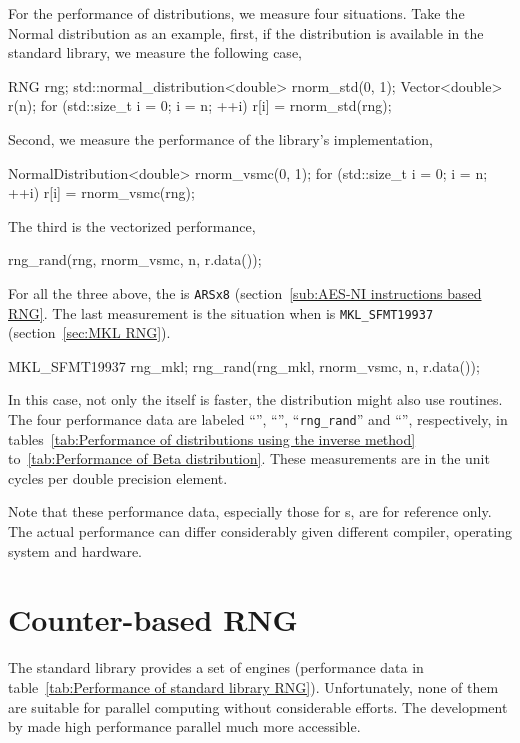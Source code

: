 For the performance of distributions, we measure four situations. Take the
Normal distribution as an example, first, if the distribution is available in
the standard library, we measure the following case,
\begin{cppcode}
  RNG rng;
  std::normal_distribution<double> rnorm_std(0, 1);
  Vector<double> r(n);
  for (std::size_t i = 0; i = n; ++i)
      r[i] = rnorm_std(rng);
\end{cppcode}
Second, we measure the performance of the \vsmc library's implementation,
\begin{cppcode}
  NormalDistribution<double> rnorm_vsmc(0, 1);
  for (std::size_t i = 0; i = n; ++i)
      r[i] = rnorm_vsmc(rng);
\end{cppcode}
The third is the vectorized performance,
\begin{cppcode}
  rng_rand(rng, rnorm_vsmc, n, r.data());
\end{cppcode}
For all the three above, the \rng is \verb|ARSx8| (section~\ref{sub:AES-NI
  instructions based RNG}. The last measurement is the situation when \rng is
\verb|MKL_SFMT19937| (section~\ref{sec:MKL RNG}).
\begin{cppcode}
  MKL_SFMT19937 rng_mkl;
  rng_rand(rng_mkl, rnorm_vsmc, n, r.data());
\end{cppcode}
In this case, not only the \rng itself is faster, the distribution might also
use \mkl routines. The four performance data are labeled ``\std'', ``\vsmc'',
``\verb|rng_rand|'' and ``\mkl'', respectively, in tables~\ref{tab:Performance
  of distributions using the inverse method} to~\ref{tab:Performance of Beta
  distribution}. These measurements are in the unit cycles per double precision
element.

Note that these performance data, especially those for \rng{}s, are for
reference only. The actual performance can differ considerably given different
compiler, operating system and hardware.

\section{Counter-based RNG}
\label{sec:Counter-based RNG}

The standard library provides a set of \rng engines (performance data in
table~\ref{tab:Performance of standard library RNG}). Unfortunately, none of
them are suitable for parallel computing without considerable efforts. The
development by \textcite{Salmon:2011um} made high performance parallel \rng
much more accessible.

